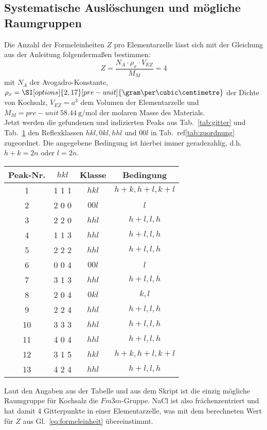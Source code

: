 \subsection{Systematische Auslöschungen und mögliche Raumgruppen}
Die Anzahl der Formeleinheiten $Z$ pro Elementarzelle lässt sich mit der Gleichung aus der Anleitung folgendermaßen bestimmen:
\begin{equation}\label{eq:formeleinheit}
    Z = \frac{N_A \cdot \rho_x \cdot V_{EZ}}{M_M} = 4
\end{equation}
mit $N_A$ der Avogadro-Konstante, $\rho_x = \SI[options]{2,17}[pre-unit]{\gram \per \cubic \centimetre}$ der Dichte von Kochsalz, $V_{EZ} = a^3$ dem Volumen der Elementarzelle und $M_M = \SI[options]{58,44}[pre-unit]{\gram \per \mol}$ der molaren Masse des Materials.\\
Jetzt werden die gefundenen und indizierten Peaks aus Tab.~\ref{tab:gitter} und Tab.~\ref{tab:nonfitval} den Reflexklassen $hkl, 0kl, hhl $ und $00l$ in Tab.~ref\ref{tab:zuordnung} zugeordnet. Die angegebene Bedingung ist hierbei immer geradezahlig, d.h. $h+k = 2n$ oder $l = 2n$.

\begin{table}[h]\label{tab:nonfitval}
    \centering
     \begin{tabular}{|c|c|c|c|} 
     \hline
     Peak-Nr. &  $h k l$ & Klasse & Bedingung\\ [0.5ex] 
     \hline\hline
     1 & 1 1 1 & $hkl$ &  $h+k, h+l, k+l$ \\
     2 & 2 0 0 & $00l$ & $l$\\
     3 & 2 2 0 & $hhl$ &  $h+l, l, h$\\
     4 & 1 1 3 & $hhl$ & $h+l, l, h$\\
     5 & 2 2 2 & $hhl$ & $h+l, l, h$\\
     6 & 0 0 4 & $00l$ & $l$\\
     7 & 3 1 3 & $hhl$ & $h+l, l, h$\\
     8 & 2 0 4 & $0kl$ & $k, l$\\
     9 & 2 2 4 & $hhl$ & $h+l, l, h$\\
     10 & 3 3 3 & $hhl$ & $h+l, l, h$\\
     11 & 4 0 4 & $hhl$ & $h+l, l, h$\\
     12 & 3 1 5 & $hkl$ & $h+k, h+l, k+l$\\
     13 & 4 2 4 & $hhl$ & $h+l, l, h$\\  [1ex]
     \hline
     \end{tabular}
\end{table}

Laut den Angaben aus der Tabelle und aus dem Skript ist die einzig mögliche Raumgruppe für Kochsalz die $Fm\overline{3}m$-Gruppe. NaCl ist also frächenzentriert und hat damit 4 Gitterpunkte in einer Elementarzelle, was mit dem berechneten Wert für $Z$ aus Gl.~\ref{eq:formeleinheit} übereinstimmt.\\